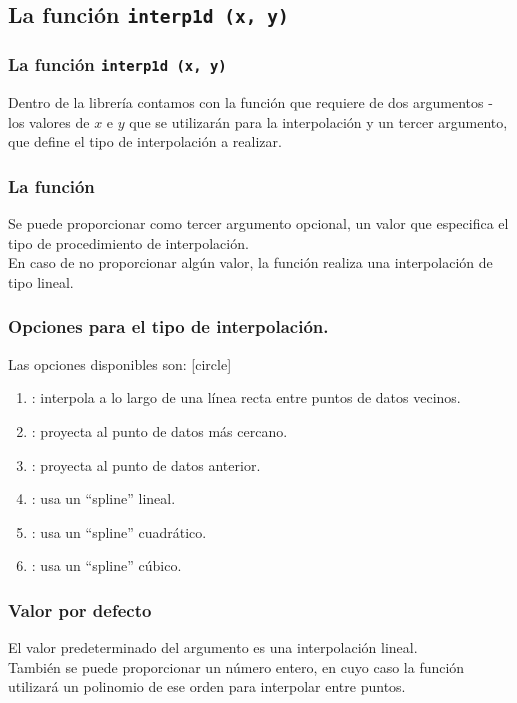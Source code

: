 {\subsection{La función \texttt{interp1d (x, y)}}
\begin{frame}
\frametitle{La función \texttt{interp1d (x, y)}}
Dentro de la librería  contamos con la función  que requiere de dos argumentos - los valores de $x$ e $y$ que se utilizarán para la interpolación y un tercer argumento, que define el tipo de interpolación a realizar.
\\
\bigskip
{}
\end{frame}
\begin{frame}
\frametitle{La función }
Se puede proporcionar como tercer argumento opcional, un valor que especifica el tipo de procedimiento de interpolación.
\\
\bigskip
En caso de no proporcionar algún valor, la función realiza una interpolación de tipo lineal.
\end{frame}
\begin{frame}
\frametitle{Opciones para el tipo de interpolación.}
Las opciones disponibles son:
[circle]
\begin{enumerate}[<+->]
\item {}: interpola a lo largo de una línea recta entre puntos de datos vecinos.
\item {}: proyecta al punto de datos más cercano.
\item {}: proyecta al punto de datos anterior.
\item {}: usa un \enquote{spline} lineal.
\item {}: usa un \enquote{spline} cuadrático.
\item {}: usa un \enquote{spline} cúbico.
\end{enumerate}
\end{frame}
\begin{frame}[fragile]
\frametitle{Valor por defecto}
El valor predeterminado del argumento  es una interpolación lineal.
\\
\bigskip
También se puede proporcionar un número entero, en cuyo caso la función utilizará un polinomio de ese orden para interpolar entre puntos.

\end{frame}}
